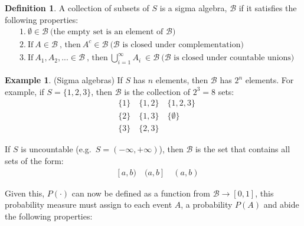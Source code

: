 \documentclass[
  oneside,
  11pt, a4paper,
  footinclude=true,
  headinclude=true,
  cleardoublepage=empty
]{scrbook}
\theoremstyle{definition}
\newtheorem{definition}{Definition}[section]
\theoremstyle{definition}
\newtheorem{example}{Example}[definition]
\begin{document}
                \begin{definition}{A collection of subsets of $S$ is a sigma algebra, $\mathscr{B}$ if it satisfies the following properties:}
                \begin{align*}
                    &1.\ \emptyset \in \mathscr{B}\ \text{(the empty set is an element of $\mathscr{B}$)}\\
                    &2.\ \text{If}\ A \in \mathscr{B}\ \text{, then}\ A^c \in \mathscr{B}\  \text{($\mathscr{B}$ is closed under complementation)}\\
                    &3.\ \text{If}\ A_1, A_2, ... \in \mathscr{B}\ \text{, then}\ \bigcup_{i=1}^{\infty} A_i \ \in \mathscr{B}\ \text{($\mathscr{B}$ is closed under countable unions)}
                \end{align*}{}
                \end{definition}{}
                
                \begin{example}{(Sigma algebras)}
                    If $S$ has $n$ elements, then $\mathscr{B}$ has $2^n$ elements. For example, if $S = \{1,2,3\}$, then $\mathscr{B}$ is the collection of $2^3 = 8$ sets:
                    \begin{align*}
                        &\{1\}\quad \{1,2\}\quad \{1,2,3\} \\
                        &\{2\}\quad \{1,3\}\quad \{\emptyset\} \\
                        &\{3\}\quad \{2,3\}
                    \end{align*}{}
                    
                    If $S$ is uncountable (e.g.\ $S = (-\infty, +\infty)$), then $\mathscr{B}$ is the set that contains all sets of the form:
                    \begin{align*}
                       [a, b]\quad [a, b)\quad (a, b]\quad (a, b) 
                    \end{align*}{}
                \end{example}{}
                
                Given this, $P(\cdot)$ can now be defined as a function from $\mathscr{B} \rightarrow [0,1]$, this probability measure must assign to each event $A$, a probability $P(A)$ and abide the following properties:
                
\end{document}
